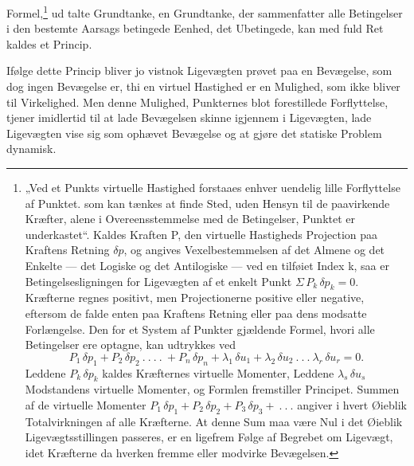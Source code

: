 \documentclass[12pt,a4paper]{book}
\begin{document}
Formel,\footnote{%
„Ved et Punkts virtuelle Hastighed forstaaes enhver uendelig lille
Forflyttelse af Punktet. som kan tænkes at finde Sted, uden Hensyn til de
paavirkende Kræfter, alene i Overeensstemmelse med de Betingelser,
Punktet er underkastet“. Kaldes Kraften P, den virtuelle Hastigheds
Projection paa Kraftens Retning $\delta p$, og angives
Vexelbestemmelsen af det Almene og det Enkelte --- det Logiske og det
Antilogiske --- ved en tilføiet Index k, saa er Betingelsesligningen for
Ligevægten af et enkelt Punkt $\Sigma\, P_{k}\, \delta p_{k} = 0$.
Kræfterne regnes positivt, men Projectionerne positive eller negative,
eftersom de falde enten paa Kraftens Retning eller paa dens modsatte
Forlængelse. Den for et System af Punkter gjældende Formel, hvori alle
Betingelser ere optagne, kan udtrykkes ved
\[
P_{1}\, \delta p_{1} + P_{2}\, \delta p_{2} \ .\ .\ .\ .\ + P_{n}\,
\delta p_{n} + \lambda_{1}\, \delta u_{1} + \lambda_{2}\, \delta u_{2}
\ .\ .\ .\ \lambda_{r}\, \delta u_{r} = 0.
\]
Leddene $P_{k}\, \delta p_{k}$ kaldes Kræfternes virtuelle Momenter,
Leddene $\lambda_{s}\, \delta u_{s}$ Modstandens virtuelle Momenter, og
Formlen fremstiller Principet. Summen af de virtuelle Momenter
$P_{1}\, \delta p_{1} + P_{2}\, \delta p_{2} + P_{3}\, \delta p_{3} +
\ .\ .\ .$ angiver i hvert Øieblik
Totalvirkningen af alle Kræfterne. At denne Sum maa være Nul i det
Øieblik Ligevægtsstillingen passeres, er en ligefrem Følge af Begrebet om
Ligevægt, idet Kræfterne da hverken fremme eller modvirke Bevægelsen.}
ud\-%
talte Grundtanke, en Grundtanke, der sammenfatter alle Betingelser i den
bestemte Aarsags betingede Eenhed, det Ubetingede, kan med fuld Ret
kaldes et Princip.

Ifølge dette Princip bliver jo vistnok Ligevægten prøvet paa en
Bevægelse, som dog ingen Bevægelse er, thi en virtuel Hastighed er en
Mulighed, som ikke bliver til Virkelighed. Men denne Mulighed,
Punkternes blot forestillede Forflyttelse, tjener imidlertid til at lade
Bevægelsen skinne igjennem i Ligevægten, lade Ligevægten vise sig som
ophævet Bevægelse og at gjøre det statiske Problem dynamisk.
\end{document}
